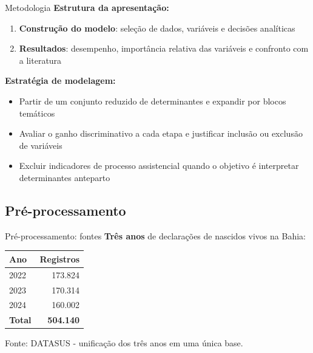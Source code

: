 \documentclass[aspectratio=169,xcolor=table]{beamer}
\begin{document}
\begin{frame}{Metodologia}
    \textbf{Estrutura da apresentação:}
    \begin{enumerate}
        \item \textbf{Construção do modelo}: seleção de dados, variáveis e decisões analíticas
        \item \textbf{Resultados}: desempenho, importância relativa das variáveis e confronto com a literatura
    \end{enumerate}

    \vspace{0.5em}
    \textbf{Estratégia de modelagem:}
    \begin{itemize}
        \item Partir de um conjunto reduzido de determinantes e expandir por blocos temáticos
        \item Avaliar o ganho discriminativo a cada etapa e justificar inclusão ou exclusão de variáveis
        \item Excluir indicadores de processo assistencial quando o objetivo é interpretar determinantes anteparto
    \end{itemize}
\end{frame}

\subsection{Pré-processamento}

\begin{frame}{Pré-processamento: fontes}
    \textbf{Três anos} de declarações de nascidos vivos na Bahia:

    \vspace{0.6em}
    \begin{table}
        \centering
        \begin{tabular}{lr}
            \toprule
            Ano & Registros \\
            \midrule
            2022 & 173.824 \\
            2023 & 170.314 \\
            2024 & 160.002 \\
            \midrule
            \textbf{Total} & \textbf{504.140} \\
            \bottomrule
        \end{tabular}
    \end{table}

    \vspace{0.4em}
    {\small Fonte: DATASUS - unificação dos três anos em uma única base.}
\end{frame}
\end{document}
